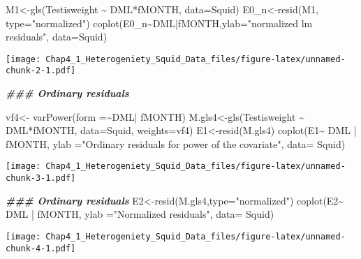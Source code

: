 \documentclass[
]{article}
\newenvironment{Shaded}{\begin{snugshade}}{\end{snugshade}}
\newcommand{\AttributeTok}[1]{\textcolor[rgb]{0.77,0.63,0.00}{#1}}
\newcommand{\DocumentationTok}[1]{\textcolor[rgb]{0.56,0.35,0.01}{\textbf{\textit{#1}}}}
\newcommand{\FunctionTok}[1]{\textcolor[rgb]{0.00,0.00,0.00}{#1}}
\newcommand{\NormalTok}[1]{#1}
\newcommand{\OtherTok}[1]{\textcolor[rgb]{0.56,0.35,0.01}{#1}}
\newcommand{\SpecialCharTok}[1]{\textcolor[rgb]{0.00,0.00,0.00}{#1}}
\newcommand{\StringTok}[1]{\textcolor[rgb]{0.31,0.60,0.02}{#1}}
\begin{document}
\begin{Shaded}
\begin{Highlighting}[]
\NormalTok{M1}\OtherTok{\textless{}{-}}\FunctionTok{gls}\NormalTok{(Testisweight }\SpecialCharTok{\textasciitilde{}}\NormalTok{ DML}\SpecialCharTok{*}\NormalTok{fMONTH, }\AttributeTok{data=}\NormalTok{Squid)}
\NormalTok{E0\_n}\OtherTok{\textless{}{-}}\FunctionTok{resid}\NormalTok{(M1, }\AttributeTok{type=}\StringTok{"normalized"}\NormalTok{)}
\FunctionTok{coplot}\NormalTok{(E0\_n}\SpecialCharTok{\textasciitilde{}}\NormalTok{DML}\SpecialCharTok{|}\NormalTok{fMONTH,}\AttributeTok{ylab=}\StringTok{"normalized lm residuals"}\NormalTok{, }\AttributeTok{data=}\NormalTok{Squid)}
\end{Highlighting}
\end{Shaded}

\texttt{[image: Chap4\_1\_Heterogeniety\_Squid\_Data\_files/figure-latex/unnamed-chunk-2-1.pdf]}

\begin{Shaded}
\begin{Highlighting}[]
\DocumentationTok{\#\#\# Ordinary residuals}

\NormalTok{vf4}\OtherTok{\textless{}{-}} \FunctionTok{varPower}\NormalTok{(}\AttributeTok{form =}\SpecialCharTok{\textasciitilde{}}\NormalTok{DML}\SpecialCharTok{|}\NormalTok{ fMONTH)}
\NormalTok{M.gls4}\OtherTok{\textless{}{-}}\FunctionTok{gls}\NormalTok{(Testisweight }\SpecialCharTok{\textasciitilde{}}\NormalTok{ DML}\SpecialCharTok{*}\NormalTok{fMONTH, }\AttributeTok{data=}\NormalTok{Squid, }\AttributeTok{weights=}\NormalTok{vf4)}
\NormalTok{E1}\OtherTok{\textless{}{-}}\FunctionTok{resid}\NormalTok{(M.gls4)}
\FunctionTok{coplot}\NormalTok{(E1}\SpecialCharTok{\textasciitilde{}}\NormalTok{ DML }\SpecialCharTok{|}\NormalTok{ fMONTH, }\AttributeTok{ylab =}\StringTok{"Ordinary residuals for power of the covariate"}\NormalTok{, }\AttributeTok{data=}\NormalTok{ Squid)}
\end{Highlighting}
\end{Shaded}

\texttt{[image: Chap4\_1\_Heterogeniety\_Squid\_Data\_files/figure-latex/unnamed-chunk-3-1.pdf]}

\begin{Shaded}
\begin{Highlighting}[]
\DocumentationTok{\#\#\# Ordinary residuals}
\NormalTok{E2}\OtherTok{\textless{}{-}}\FunctionTok{resid}\NormalTok{(M.gls4,}\AttributeTok{type=}\StringTok{"normalized"}\NormalTok{)}
\FunctionTok{coplot}\NormalTok{(E2}\SpecialCharTok{\textasciitilde{}}\NormalTok{ DML }\SpecialCharTok{|}\NormalTok{ fMONTH, }\AttributeTok{ylab =}\StringTok{"Normalized residuals"}\NormalTok{, }\AttributeTok{data=}\NormalTok{ Squid)}
\end{Highlighting}
\end{Shaded}

\texttt{[image: Chap4\_1\_Heterogeniety\_Squid\_Data\_files/figure-latex/unnamed-chunk-4-1.pdf]}
\end{document}
